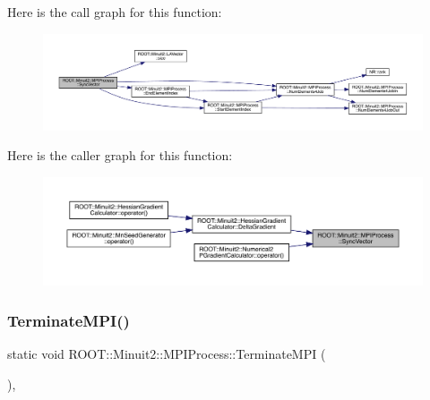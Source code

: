 Here is the call graph for this function\+:
\nopagebreak
\begin{figure}[H]
\begin{center}
\leavevmode
\includegraphics[width=350pt]{dc/d43/classROOT_1_1Minuit2_1_1MPIProcess_a179f3ea817399a73cbce05d1778ec128_cgraph}
\end{center}
\end{figure}
Here is the caller graph for this function\+:
\nopagebreak
\begin{figure}[H]
\begin{center}
\leavevmode
\includegraphics[width=350pt]{dc/d43/classROOT_1_1Minuit2_1_1MPIProcess_a179f3ea817399a73cbce05d1778ec128_icgraph}
\end{center}
\end{figure}
\mbox{\label{classROOT_1_1Minuit2_1_1MPIProcess_aa870a057a256be2d95fb7e9d03a9c298}} 
\subsubsection{\texorpdfstring{TerminateMPI()}{TerminateMPI()}\hspace{0.1cm}{\footnotesize\ttfamily [1/3]}}
{\footnotesize\ttfamily static void R\+O\+O\+T\+::\+Minuit2\+::\+M\+P\+I\+Process\+::\+Terminate\+M\+PI (\begin{DoxyParamCaption}{ }\end{DoxyParamCaption})\hspace{0.3cm}{\ttfamily [inline]}, {\ttfamily [static]}}

\mbox{\label{classROOT_1_1Minuit2_1_1MPIProcess_aa870a057a256be2d95fb7e9d03a9c298}} 
